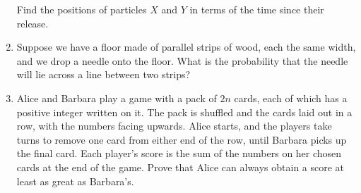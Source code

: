 \documentclass{article}
\begin{document}
\begin{enumerate}
    Find the positions of particles $X$ and $Y$ in terms of the time since their release.

    \item
    Suppose we have a floor made of parallel strips of wood, each the same width, and we drop a needle onto the floor. What is the probability that the needle will lie across a line between two strips?

    \item
    Alice and Barbara play a game with a pack of $2n$ cards, each of which has a positive integer written on it. The pack is shuffled and the cards laid out in a row, with the numbers facing upwards. Alice starts, and the players take turns to remove one card from either end of the row, until Barbara picks up the final card. Each player’s score is the sum of the numbers on her chosen cards at the end of the game. Prove that Alice can always obtain a score at least as great as Barbara’s.
    
    
    
    
    
    
    
    
    

\end{enumerate}
\end{document}

